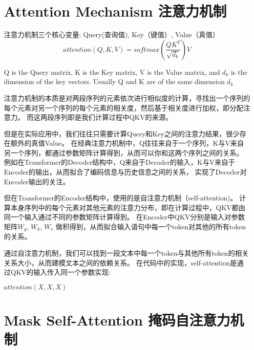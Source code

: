 \documentclass{article}
\begin{document}
\section{Attention Mechanism 注意力机制}

注意力机制三个核心变量: Query(查询值), Key（键值）, Value（真值）
\begin{equation}
    attention(Q,K,V) = softmax(\frac{QK^T}{\sqrt{d_k}})V
    \label{eq:attention}
\end{equation}

Q is the Query matrix, K is the Key matrix, V is the Value matrix, and $d_k$ is the dimension of the key vectors.
Usually Q and K are of the same dimension $d_k$

注意力机制的本质是对两段序列的元素依次进行相似度的计算，寻找出一个序列的每个元素对另一个序列的每个元素的相关度，然后基于相关度进行加权，即分配注意力。
而这两段序列即是我们计算过程中QKV的来源。

但是在实际应用中，我们往往只需要计算Query和Key之间的注意力结果，很少存在额外的真值Value。
在经典注意力机制中，Q往往来自于一个序列，K与V来自另一个序列，都通过参数矩阵计算得到，从而可以你和这两个序列之间的关系。
例如在Transformer的Decoder结构中，Q来自于Decoder的输入，K与V来自于Encoder的输出，从而拟合了编码信息与历史信息之间的关系，
实现了Decoder对Encoder输出的关注。

但在Transformer的Encoder结构中，使用的是自注意力机制（self-attention)。
计算本身序列中的每个元素对其他元素的注意力分布，即在计算过程中，QKV都由同一个输入通过不同的参数矩阵计算得到。
在Encoder中QKV分别是输入对参数矩阵$W_q$, $W_k$, $W_v$ 做积得到，从而拟合输入语句中每一个token对其他的所有token的关系。

通过自注意力机制，我们可以找到一段文本中每一个token与其他所有token的相关关系大小，从而建模文本之间的依赖关系。
在代码中的实现，self-attention是通过QKV的输入传入同一个参数实现:

$attention(X,X,X)$


\section{Mask Self-Attention 掩码自注意力机制}

% 
\end{document}
